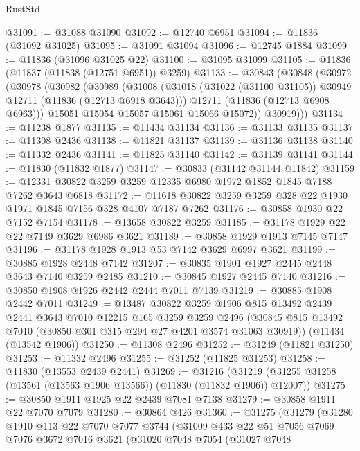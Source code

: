 \begin{lexlean}{RustStd}
\begin{coremodule}
@31091 := @31088 @31090
@31092 := @12740 @6951
@31094 := @11836 (@31092 @31025)
@31095 := @31091 @31094
@31096 := @12745 @1884
@31099 := @11836 (@31096 @31025 @22)
@31100 := @31095 @31099
@31105 := @11836 (@11837 (@11838 (@12751 @6951)) @3259)
@31133 := @30843
    (@30848
      (@30972
        (@30978
          (@30982
            (@30989
              (@31008
                (@31018 (@31022 (@31100 @31105)) @30949 @12711 (@11836 (@12713 @6918 @3643)))
                @12711
                (@11836 (@12713 @6908 @6963)))
              @15051
              @15054
              @15057
              @15061
              @15066
              @15072))
          @30919)))
@31134 := @11238 @1877
@31135 := @11434 @31134
@31136 := @31133 @31135
@31137 := @11308 @2436
@31138 := @11821 @31137
@31139 := @31136 @31138
@31140 := @11332 @2436
@31141 := @11825 @31140
@31142 := @31139 @31141
@31144 := @11830 (@11832 @1877)
@31147 := @30833 (@31142 @31144 @11842)
@31159 := @12331 @30822 @3259 @3259 @12335 @6980 @1972 @1852 @1845 @7188 @7262 @3643 @6818
@31172 := @11618 @30822 @3259 @3259 @328 @22 @1930 @1971 @1845 @7156 @328 @4107 @7187 @7262
@31176 := @30858 @1930 @22 @7152 @7154
@31178 := @13658 @30822 @3259
@31185 := @31178 @1929 @22 @22 @7149 @3629 @6986 @3621
@31189 := @30858 @1929 @1913 @7145 @7147
@31196 := @31178 @1928 @1913 @53 @7142 @3629 @6997 @3621
@31199 := @30885 @1928 @2448 @7142
@31207 := @30835 @1901 @1927 @2445 @2448 @3643 @7140 @3259 @2485
@31210 := @30845 @1927 @2445 @7140
@31216 := @30850 @1908 @1926 @2442 @2444 @7011 @7139
@31219 := @30885 @1908 @2442 @7011
@31249 := @13487
    @30822
    @3259
    @1906
    @815
    @13492
    @2439
    @2441
    @3643
    @7010
    @12215
    @165
    @3259
    @3259
    @2496
    (@30845 @815 @13492 @7010 (@30850 @301 @315 @294 @27 @4201 @3574 @31063 @30919))
    (@11434 (@13542 @1906))
@31250 := @11308 @2496
@31252 := @31249 (@11821 @31250)
@31253 := @11332 @2496
@31255 := @31252 (@11825 @31253)
@31258 := @11830 (@13553 @2439 @2441)
@31269 := @31216
    (@31219 (@31255 @31258 (@13561 (@13563 @1906 @13566)) (@11830 (@11832 @1906)) @12007))
@31275 := @30850 @1911 @1925 @22 @2439 @7081 @7138
@31279 := @30858 @1911 @22 @7070 @7079
@31280 := @30864 @426
@31360 := @31275
    (@31279
      (@31280
        @1910
        @113
        @22
        @7070
        @7077
        @3744
        (@31009
          @433
          @22
          @51
          @7056
          @7069
          @7076
          @3672
          @7016
          @3621
          (@31020
            @7048
            @7054
            (@31027
              @7048

\end{coremodule}
\end{lexlean}
